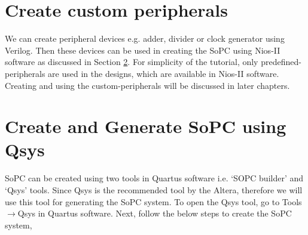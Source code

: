 \section{Create custom peripherals}
We can create peripheral devices e.g. adder, divider or clock generator using Verilog. Then these devices can be used in creating the SoPC using Nios-II software as discussed in Section \ref{sec:CreateGenerateQsys}. For simplicity of the tutorial, only predefined-peripherals are used in the designs, which are available in Nios-II software. Creating and using the custom-peripherals will be discussed in later chapters. 


\section{Create and Generate SoPC using Qsys}\label{sec:CreateGenerateQsys}
SoPC can be created using two tools in Quartus software i.e. `SOPC builder' and `Qsys' tools. Since Qsys is the recommended tool by the Altera, therefore we will use this tool for generating the SoPC system. To open the Qsys tool, go to Tools$\rightarrow$Qsys in Quartus software. Next, follow the below steps to create the SoPC system,
